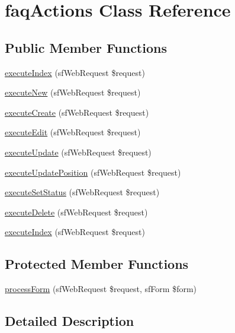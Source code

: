 \hypertarget{classfaq_actions}{\section{faq\-Actions Class Reference}
\label{classfaq_actions}
}
\subsection*{Public Member Functions}
\begin{DoxyCompactItemize}
\item 
\hyperlink{classfaq_actions_a948cc911eb1d9f77990be54af3b2080f}{execute\-Index} (sf\-Web\-Request \$request)
\item 
\hyperlink{classfaq_actions_a0ffbea56560c6c633dae68ec22aff21c}{execute\-New} (sf\-Web\-Request \$request)
\item 
\hyperlink{classfaq_actions_a75837617743fb64dca82d8133b2c662a}{execute\-Create} (sf\-Web\-Request \$request)
\item 
\hyperlink{classfaq_actions_af4d8fedd4b28f3398826a1bb8fa54394}{execute\-Edit} (sf\-Web\-Request \$request)
\item 
\hyperlink{classfaq_actions_af7b4f51862add3c2ebb54efc136a0840}{execute\-Update} (sf\-Web\-Request \$request)
\item 
\hyperlink{classfaq_actions_acae2fa1cffde05d8c0331ca062d5ee54}{execute\-Update\-Position} (sf\-Web\-Request \$request)
\item 
\hyperlink{classfaq_actions_a365ffe9a4c547cdb81d9e2131e7bd7b9}{execute\-Set\-Status} (sf\-Web\-Request \$request)
\item 
\hyperlink{classfaq_actions_a52b5b11b11a0070dd2662257520c045a}{execute\-Delete} (sf\-Web\-Request \$request)
\item 
\hyperlink{classfaq_actions_a948cc911eb1d9f77990be54af3b2080f}{execute\-Index} (sf\-Web\-Request \$request)
\end{DoxyCompactItemize}
\subsection*{Protected Member Functions}
\begin{DoxyCompactItemize}
\item 
\hyperlink{classfaq_actions_a7cf661d837626e0320753cbffa019a01}{process\-Form} (sf\-Web\-Request \$request, sf\-Form \$form)
\end{DoxyCompactItemize}


\subsection{Detailed Description}


